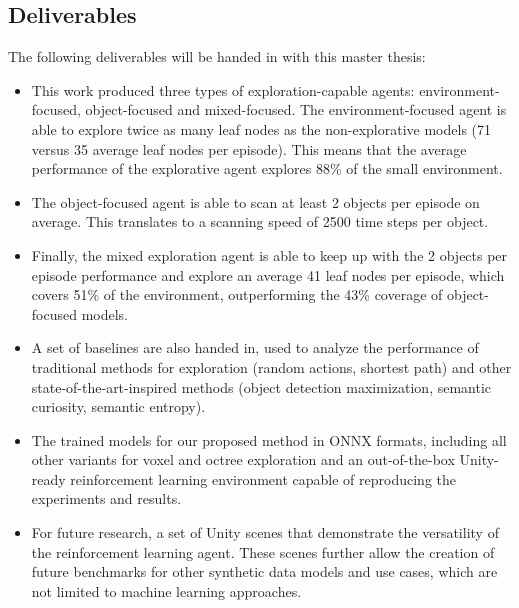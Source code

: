 \subsection{Deliverables}
The following deliverables will be handed in with this master thesis:
\begin{itemize}
    \item This work produced three types of exploration-capable agents: environment-focused, object-focused and mixed-focused.
    The environment-focused agent is able to explore twice as many leaf nodes as the non-explorative models (71 versus 35 average leaf nodes per episode). This means that the average performance of the explorative agent explores 88\% of the small environment. 
    
    \item  The object-focused agent is able to scan at least 2 objects per episode on average. This translates to a scanning speed of 2500 time steps per object.
    
    \item Finally, the mixed exploration agent is able to keep up with the 2 objects per episode performance and explore an average 41 leaf nodes per episode, which covers 51\% of the environment, outperforming the 43\% coverage of object-focused models.
   
   \item A set of baselines are also handed in, used to analyze the performance of traditional methods for exploration (random actions, shortest path) and other state-of-the-art-inspired methods (object detection maximization, semantic curiosity, semantic entropy).
   
    \item The trained models for our proposed method in ONNX formats, including all other variants for voxel and octree exploration and an out-of-the-box Unity-ready reinforcement learning environment capable of reproducing the experiments and results.

    \item For future research, a set of Unity scenes that demonstrate the versatility of the reinforcement learning agent. These scenes further allow the creation of future benchmarks for other synthetic data models and use cases, which are not limited to machine learning approaches.
\end{itemize}



